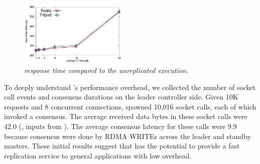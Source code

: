 \begin{figure}[h]
\centering
\includegraphics[width=0.47\textwidth]{figures/latency}
\caption{\small {\em \xxx response time compared to the unreplicated 
execution.}}
\label{fig:latency}
\end{figure}

To deeply understand \xxx's performance overhead, we collected the number of 
socket call events and consensus durations on the leader controller side. Given 
10K requests and 8 concurrent connections, \redis spawned 10,016 socket calls, 
each of which invoked a \paxos consensus. The average received data bytes in 
these socket calls were 42.0 (\eg, inputs from \recv). The average consensus 
latency for these calls were 9.9 \us because consensus were done by RDMA WRITEs 
across the leader and standby masters. These initial results suggest that \xxx 
has the potential to provide a fast \paxos replication service to general 
applications with low overhead. 





% 


